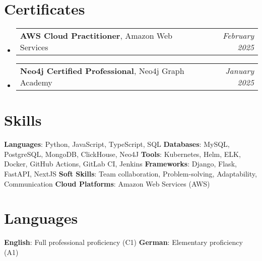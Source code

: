 \documentclass[letterpaper,11pt]{article}
\makeatletter
\newcommand{\resumeItem}[2]{
  \item\small{
    \textbf{#1}{: #2 \vspace{-2pt}}
  }
}
\newcommand{\resumeSubItem}[2]{\resumeItem{#1}{#2}\vspace{-4pt}}
\newcommand{\resumeSubHeadingListStart}{\begin{itemize}[leftmargin=*]}
\newcommand{\resumeSubHeadingListEnd}{\end{itemize}}
\newcommand{\titleWithDescription}[2]{\textbf{#1}{: #2}}
\newcommand{\resumeLanguages}[4]{
  \section{Languages}
    \noindent
    \titleWithDescription{#1}{#2}
    \hfill
    \titleWithDescription{#3}{#4}
}
\newcommand{\certificateItem}[3]{
  \item\begin{tabular*}{0.97\textwidth}{l@{\extracolsep{\fill}}r}
    \small{
      \textbf{#1}{, #2 \vspace{-2pt}}
    } & \textit{\small #3} \\
  \end{tabular*}\vspace{-5pt}
}
\makeatother
\begin{document}

\section{Certificates}
  \resumeSubHeadingListStart

    \certificateItem
      {AWS Cloud Practitioner}
      {Amazon Web Services}
      {February 2025}\vspace{3px}

    \certificateItem
      {Neo4j Certified Professional}
      {Neo4j Graph Academy}
      {January 2025}

  \resumeSubHeadingListEnd

%
\section{Skills}

  \titleWithDescription{Languages}{Python, JavaScript, TypeScript, SQL}\vspace{3pt}
  \hfill
  \titleWithDescription{Databases}{MySQL, PostgreSQL, MongoDB, ClickHouse, Neo4J}
  \newline
  \titleWithDescription{Tools}{Kubernetes, Helm, ELK, Docker, GitHub Actions, GitLab CI, Jenkins}
  \hfill
  \titleWithDescription{Frameworks}{Django, Flask, FastAPI, NextJS}\vspace{3pt}
  \newline
  \titleWithDescription{Soft Skills}{Team collaboration, Problem-solving, Adaptability, Communication}
  \hfill
  \titleWithDescription{Cloud Platforms}{Amazon Web Services (AWS)}
\resumeLanguages
  {English}
  {Full professional proficiency (C1)}
  {German}
  {Elementary proficiency (A1)}
\end{document}
